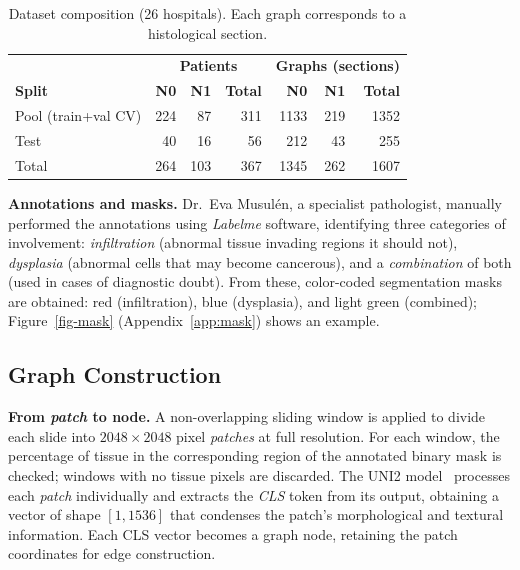 \documentclass[10pt,a4paper,twocolumn,twoside]{article}
\begin{document}
\begin{table}[t]
\centering
\caption{Dataset composition (26 hospitals). Each graph corresponds to a histological section.}
\label{tab:dataset}
\small
\begin{tabular}{lrrr|rrr}
\toprule
 & \multicolumn{3}{c|}{\textbf{Patients}} & \multicolumn{3}{c}{\textbf{Graphs (sections)}} \\
\textbf{Split} & \textbf{N0} & \textbf{N1} & \textbf{Total} & \textbf{N0} & \textbf{N1} & \textbf{Total} \\
\midrule
Pool (train+val CV) & 224 &  87 & 311 & 1133 & 219 & 1352 \\
Test                &  40 &  16 &  56 &   212  &  43 &   255  \\
\midrule
Total & 264 & 103 & 367 & 1345 & 262 & 1607 \\
\bottomrule
\end{tabular}
\end{table}

\textbf{Annotations and masks.}
\label{sec:anotacions-masques}
Dr.\ Eva Musulén, a specialist pathologist, manually performed the annotations using
\textit{Labelme} software, identifying three categories of involvement: \textit{infiltration} (abnormal tissue
invading regions it should not), \textit{dysplasia} (abnormal cells that may become
cancerous), and a \textit{combination} of both (used in cases of diagnostic doubt). From these,
color-coded segmentation masks are obtained: red (infiltration), blue (dysplasia), and light
green (combined); Figure~\ref{fig-mask} (Appendix~\ref{app:mask}) shows an example.

\subsection{Graph Construction}

\textbf{From \textit{patch} to node.} A non-overlapping sliding window is applied
to divide each slide into
$2048 \times 2048$ pixel \textit{patches} at full resolution. For each window, the
percentage of tissue in the corresponding region of the annotated binary mask is checked;
windows with no tissue pixels are discarded.
The UNI2 model~\cite{chen2024uni2} processes each \textit{patch} individually and extracts the
\textit{CLS} token from its output, obtaining a vector of shape $[1, 1536]$ that condenses the
patch's morphological and textural information. Each CLS vector becomes a graph node,
retaining the patch coordinates for edge construction.
\end{document}

